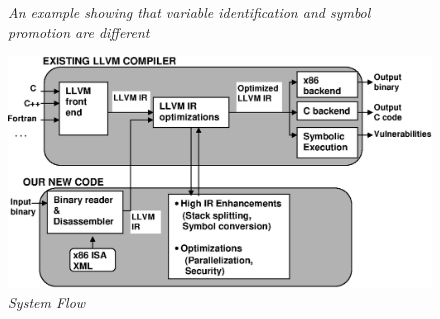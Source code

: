 \begin{figure}[t]
{\begin{minipage}{.40\linewidth}
{\caption{\textit{An example showing that variable identification and symbol promotion are different}}
\label{fig:ident-prom-diff}
}
\vspace{1ex}
{
\includegraphics[width=0.8\linewidth]{figures/EPS/flow1.eps}
\caption{\textit{System Flow}}
\label{fig:systemflow}
}
\end{minipage}
}
\vspace{-1ex}
\end{figure}
